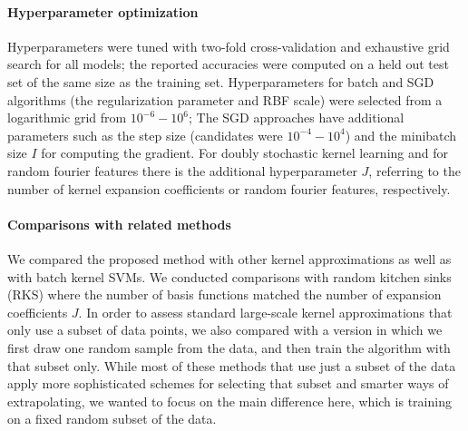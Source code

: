 \documentclass{article} %
\begin{document}
\paragraph{Hyperparameter optimization} Hyperparameters were tuned with two-fold cross-validation and exhaustive grid search for all models; the reported accuracies were computed on a held out test set of the same size as the training set. Hyperparameters for batch and SGD algorithms (the regularization parameter and RBF scale) were selected from a logarithmic grid from $10^{-6}-10^6$; The SGD approaches have additional parameters such as the step size (candidates were $10^{-4}-10^4$) and the minibatch size $I$ for computing the gradient. For doubly stochastic kernel learning and for random fourier features there is the additional hyperparameter $J$, referring to the number of kernel expansion coefficients or random fourier features, respectively.

\paragraph{Comparisons with related methods}
We compared the proposed method with other kernel approximations as well as with batch kernel SVMs. We conducted comparisons with random kitchen sinks (RKS) where the number of basis functions matched the number of expansion coefficients $J$. In order to assess standard large-scale kernel approximations that only use a subset of data points, we also compared with a version in which we first draw one random sample from the data, and then train the algorithm with that subset only. While most of these methods that use just a subset of the data apply more sophisticated schemes for selecting that subset and smarter ways of extrapolating, we wanted to focus on the main difference here, which is training on a fixed random subset of the data. 
\end{document}
